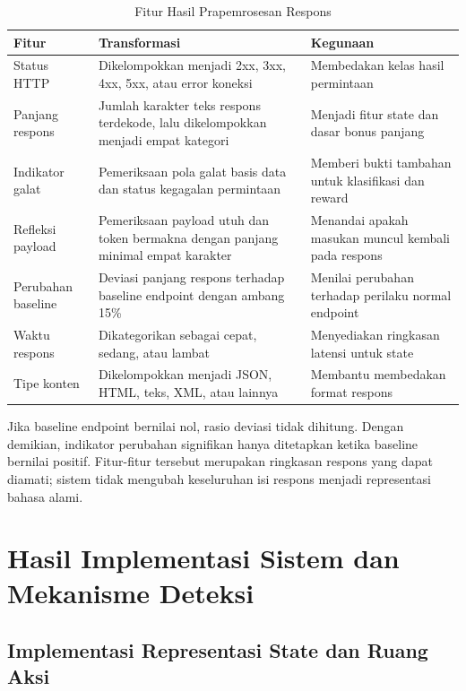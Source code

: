 \begin{enumerate}
\begin{table}[H]
\centering
\caption{Fitur Hasil Prapemrosesan Respons}
\label{tab:fitur_prapemrosesan}
\begin{tabular}{|p{3.2cm}|p{4.1cm}|p{6.2cm}|}
\hline
\textbf{Fitur} & \textbf{Transformasi} & \textbf{Kegunaan} \\
\hline
Status HTTP & Dikelompokkan menjadi 2xx, 3xx, 4xx, 5xx, atau error koneksi & Membedakan kelas hasil permintaan \\
\hline
Panjang respons & Jumlah karakter teks respons terdekode, lalu dikelompokkan menjadi empat kategori & Menjadi fitur state dan dasar bonus panjang \\
\hline
Indikator galat & Pemeriksaan pola galat basis data dan status kegagalan permintaan & Memberi bukti tambahan untuk klasifikasi dan reward \\
\hline
Refleksi payload & Pemeriksaan payload utuh dan token bermakna dengan panjang minimal empat karakter & Menandai apakah masukan muncul kembali pada respons \\
\hline
Perubahan baseline & Deviasi panjang respons terhadap baseline endpoint dengan ambang 15\% & Menilai perubahan terhadap perilaku normal endpoint \\
\hline
Waktu respons & Dikategorikan sebagai cepat, sedang, atau lambat & Menyediakan ringkasan latensi untuk state \\
\hline
Tipe konten & Dikelompokkan menjadi JSON, HTML, teks, XML, atau lainnya & Membantu membedakan format respons \\
\hline
\end{tabular}
\end{table}

Jika baseline endpoint bernilai nol, rasio deviasi tidak dihitung. Dengan demikian, indikator perubahan signifikan hanya ditetapkan ketika baseline bernilai positif. Fitur-fitur tersebut merupakan ringkasan respons yang dapat diamati; sistem tidak mengubah keseluruhan isi respons menjadi representasi bahasa alami.
\end{enumerate}

\section{Hasil Implementasi Sistem dan Mekanisme Deteksi}

\subsection{Implementasi Representasi State dan Ruang Aksi}

